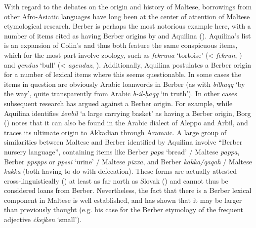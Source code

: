 \documentclass[output=paper]{langsci/langscibook}
\begin{document}
With regard to the debates on the origin and history of Maltese, borrowings from other Afro-Asiatic languages have long been at the center of attention of Maltese etymological research. Berber is perhaps the most notorious example here, with a number of items cited as having Berber origins by \cite{colin1957} and Aquilina (\citeyear[25--39]{aquilina1976}). Aquilina's list is an expansion of Colin's and thus both feature the same conspicuous items, which for the most part involve zoology, such as \textit{fekruna} `tortoise' (< \textit{fekrun}, \citealt[553]{naitzerrad2002}) and \textit{gendus} `bull' (< \textit{agenduz}, \citealt[827]{naitzerrad2002}). 
Additionally, Aquilina postulates a Berber origin for a number of lexical items where this seems questionable. In some cases the items in question are obviously Arabic loanwords in Berber (as with \textit{bilħaqq} `by the way', quite transparently from Arabic \textit{b-il-\d{h}aqq} `in truth'). In other cases subsequent research has argued against a Berber origin. For example, while Aquilina identifies \textit{żenbil} `a large carrying basket' as having a Berber origin, Borg (\citeyear[261]{Borg2004}) notes that it can also be found in the Arabic dialect of Aleppo and Arbil, and traces its ultimate origin to Akkadian through Aramaic. A large group of similarities between Maltese and Berber identified by Aquilina involve ``Berber nursery language'', containing items like Berber \textit{papa} `bread' / Maltese \textit{pappa}, Berber \textit{ppspps} or \textit{ppssi} `urine' / Maltese \textit{pixxa}, and Berber \textit{kakka/qaqah} / Maltese \textit{kakka} (both having to do with defecation). These forms are actually attested cross-linguistically (\citealt{ferguson1964}) at least as far north as Slovak (\citealt{ondrackova2010}) and cannot thus be considered loans from Berber. Nevertheless, the fact that there is a Berber lexical component in Maltese is well established, and \cite{Souag2018berber} has shown that it may be larger than previously thought (e.g. his case for the Berber etymology of the frequent adjective \textit{ċkejken} `small').
\end{document}
